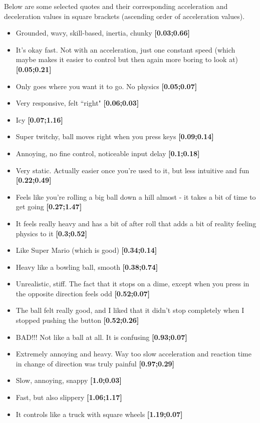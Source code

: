 Below are some selected quotes and their corresponding acceleration and deceleration values in square brackets (ascending order of acceleration values).
\begin{itemize}[noitemsep,nolistsep]
\item Grounded, wavy, skill-based, inertia, chunky \textbf{[0.03;0.66]}
\item It's okay fast. Not with an acceleration, just one constant speed (which maybe makes it easier to control but then again more boring to look at) \textbf{[0.05;0.21]}
\item Only goes where you want it to go. No physics \textbf{[0.05;0.07]}
\item Very responsive, felt ``right" \textbf{[0.06;0.03]}
\item Icy \textbf{[0.07;1.16]}
\item Super twitchy, ball moves right when you press keys \textbf{[0.09;0.14]}
\item Annoying, no fine control, noticeable input delay \textbf{[0.1;0.18]}
\item Very static. Actually easier once you're used to it, but less intuitive and fun \textbf{[0.22;0.49]}
\item Feels like you're rolling a big ball down a hill almost - it takes a bit of time to get going \textbf{[0.27;1.47]}
\item It feels really heavy and has a bit of after roll that adds a bit of reality feeling physics to it \textbf{[0.3;0.52]}
\item Like Super Mario (which is good) \textbf{[0.34;0.14]}
\item Heavy like a bowling ball, smooth \textbf{[0.38;0.74]}
\item Unrealistic, stiff. The fact that it stops on a dime, except when you press in the opposite direction feels odd \textbf{[0.52;0.07]}
\item The ball felt really good, and I liked that it didn't stop completely when I stopped pushing the button \textbf{[0.52;0.26]}
\item BAD!!! Not like a ball at all. It is confusing \textbf{[0.93;0.07]}
\item Extremely annoying and heavy. Way too slow acceleration and reaction time in change of direction was truly painful \textbf{[0.97;0.29]}
\item Slow, annoying, snappy \textbf{[1.0;0.03]}
\item Fast, but also slippery \textbf{[1.06;1.17]}
\item It controls like a truck with square wheels \textbf{[1.19;0.07]}

\end{itemize}
